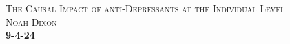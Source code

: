 \documentclass[17pt]{extarticle}  %
\begin{document}
\begin{titlepage}
    \centering
    \vspace*{\fill}

    \textsc{\Huge The Causal Impact of anti-Depressants at the Individual Level}\\[2em]

	\textsc{\Large Noah Dixon}\\[2em]
	

	\textbf{\textsc{\LARGE {\color{darkred}9-4-24} }}
	
	\vspace*{\fill}

\end{titlepage}

\newpage
\UseRawInputEncoding

\newcommand{\capitalizeTitle}[1]{%
    \StrSubstitute{#1}{ }{~}[\title]%
    \expandafter\capitalizetitle\expandafter{\title}%
}

\newcommand{\capitalizetitle}[1]{%
    \expandafter\StrSubstitute\expandafter{#1}{~}{ }[\Title]%
    \expandafter\StrSubstitute\expandafter{\Title}{ a }{ A }[\Title]%
    \expandafter\StrSubstitute\expandafter{\Title}{ an }{ An }[\Title]%
    \expandafter\StrSubstitute\expandafter{\Title}{ and }{ And }[\Title]%
    \expandafter\StrSubstitute\expandafter{\Title}{ as }{ As }[\Title]%
    \expandafter\StrSubstitute\expandafter{\Title}{ at }{ At }[\Title]%
    \expandafter\StrSubstitute\expandafter{\Title}{ but }{ But }[\Title]%
    \expandafter\StrSubstitute\expandafter{\Title}{ by }{ By }[\Title]%
    \expandafter\StrSubstitute\expandafter{\Title}{ for }{ For }[\Title]%
    \expandafter\StrSubstitute\expandafter{\Title}{ from }{ From }[\Title]%
    \expandafter\StrSubstitute\expandafter{\Title}{ in }{ In }[\Title]%
    \expandafter\StrSubstitute\expandafter{\Title}{ into }{ Into }[\Title]%
    \expandafter\StrSubstitute\expandafter{\Title}{ near }{ Near }[\Title]%
    \expandafter\StrSubstitute\expandafter{\Title}{ of }{ Of }[\Title]%
    \expandafter\StrSubstitute\expandafter{\Title}{ on }{ On }[\Title]%
    \expandafter\StrSubstitute\expandafter{\Title}{ onto }{ Onto }[\Title]%
    \expandafter\StrSubstitute\expandafter{\Title}{ or }{ Or }[\Title]%
    \expandafter\StrSubstitute\expandafter{\Title}{ the }{ The }[\Title]%
    \expandafter\StrSubstitute\expandafter{\Title}{ to }{ To }[\Title]%
    \expandafter\StrSubstitute\expandafter{\Title}{ under }{ Under }[\Title]%
    \expandafter\StrSubstitute\expandafter{\Title}{ upon }{ Upon }[\Title]%
    \expandafter\StrSubstitute\expandafter{\Title}{ with }{ With }[\Title]%
    \expandafter\StrSubstitute\expandafter{\Title}{ within }{ Within }[\Title]%
    \expandafter\StrSubstitute\expandafter{\Title}{ without }{ Without }[\Title]%
    \expandafter\StrSubstitute\expandafter{\Title}{ and }{ And }[\Title]%
    \expandafter\MakeUppercase\expandafter{\Title}%
}
\end{document}
